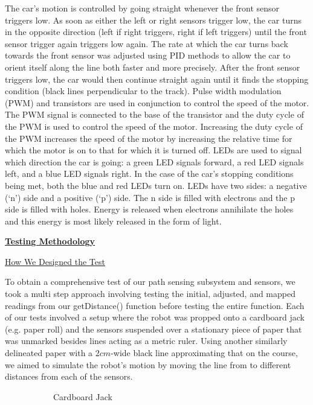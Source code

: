 \documentclass[twocolumn]{article}
\newcommand{\sectionTitle}[1]{ {\large\textbf{\uline{#1}}} \\ \vspace{1.5em} }
\newcommand{\subsectionTitle}[1]{ {\hspace{2em}\uline{#1}} \\ \vspace{1em} }
\newcommand{\textIntroTwo}{The car's motion is controlled by going straight whenever the front sensor triggers low. As soon as either the left or right sensors trigger low, the car turns in the opposite direction (left if right triggers, right if left triggers) until the front sensor trigger again triggers low again. The rate at which the car turns back towards the front sensor was adjusted using PID methods\cite{beauregard_2011} to allow the car to orient itself along the line both faster and more precisely. After the front sensor triggers low, the car would then continue straight again until it finds the stopping condition (black lines perpendicular to the track). Pulse width modulation (PWM) and transistors are used in conjunction to control the speed of the motor. The PWM signal is connected to the base of the transistor and the duty cycle of the PWM is used to control the speed of the motor. Increasing the duty cycle of the PWM increases the speed of the motor by increasing the relative time for which the motor is on to that for which it is turned off. LEDs are used to signal which direction the car is going: a green LED signals forward, a red LED signals left, and a blue LED signals right. In the case of the car’s stopping conditions being met, both the blue and red LEDs turn on. LEDs have two sides: a negative (`n’) side and a positive (`p’) side. The n side is filled with electrons and the p side is filled with holes. Energy is released when electrons annihilate the holes and this energy is most likely released in the form of light.
}
\newcommand{\textTestDesign}{To obtain a comprehensive test of our path sensing subsystem and sensors, we took a multi step approach involving testing the initial, adjusted, and mapped readings from our getDistance() function before testing the entire function. Each of our tests involved a setup where the robot was propped onto a cardboard jack (e.g. paper roll) and the sensors suspended over a stationary piece of paper that was unmarked besides lines acting as a metric ruler. Using another similarly delineated paper with a $2cm$-wide black line approximating that on the course, we aimed to simulate the robot’s motion by moving the line from to different distances from each of the sensors.
}
\begin{document}
\begin{flushleft}
		\textIntroTwo \\ \vspace{1em}
		
		\sectionTitle{Testing Methodology}
		
		\subsectionTitle{How We Designed the Test}

		\textTestDesign \\ \vspace{1em}
		
		\begin{figure}[H]
			
			{\begin{subfigure}[b]{0.45\textwidth}
					\caption{Cardboard Jack}
					\label{fig:procedureRig}
				\end{subfigure}\\ \vspace{1em}%
				\begin{subfigure}[b]{0.45\textwidth}

\end{subfigure}}
\end{figure}
\end{flushleft}
\end{document}
